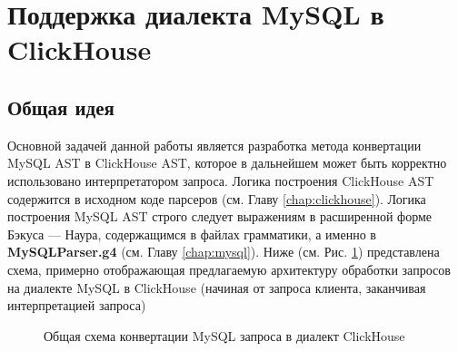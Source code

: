 \section{Поддержка диалекта MySQL в ClickHouse} \label{chap:conversion}
\subsection{Общая идея} \label{conv:general_}
Основной задачей данной работы является разработка метода конвертации MySQL AST в ClickHouse AST, которое в дальнейшем может быть корректно использовано интерпретатором запроса. Логика построения ClickHouse AST содержится в исходном коде парсеров (см. Главу \ref{chap:clickhouse}).  Логика построения MySQL AST строго следует выражениям в расширенной форме Бэкуса — Наура, содержащимся в файлах грамматики, а именно в \textbf{MySQLParser.g4} (см. Главу \ref{chap:mysql}). Ниже (см. Рис. \ref{conv:general_pic}) представлена схема, примерно отображающая предлагаемую архитектуру обработки запросов на диалекте MySQL в ClickHouse (начиная от запроса клиента, заканчивая интерпретацией запроса)

\begin{figure}[ht]
\begin{center}
\caption{
\label{conv:general_pic} Общая схема конвертации MySQL запроса в диалект ClickHouse
}
\end{center}
\end{figure}

